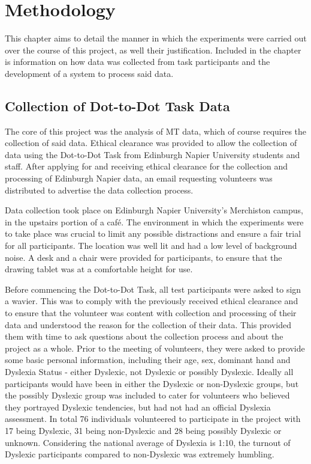 \section{Methodology}
	This chapter aims to detail the manner in which the experiments were carried out over the course of this project, as well their justification. Included in the chapter is information on how data was collected from task participants and the development of a system to process said data.

	\subsection{Collection of Dot-to-Dot Task Data}
		The core of this project was the analysis of MT data, which of course requires  the collection of said data. Ethical clearance was provided to allow the collection of data using the Dot-to-Dot Task from Edinburgh Napier University students and staff. After applying for and receiving ethical clearance for the collection and processing of Edinburgh Napier data, an email requesting volunteers was distributed to advertise the data collection process.
	
		Data collection took place on Edinburgh Napier University’s Merchiston campus, in the upstairs portion of a café. The environment in which the experiments were to take place was crucial to limit any possible distractions and ensure a fair trial for all participants. The location was well lit and had a low level of background noise. A desk and a chair were provided for participants, to ensure that the drawing tablet was at a comfortable height for use. 
	
		Before commencing the Dot-to-Dot Task, all test participants were asked to sign a wavier. This was to comply with the previously received ethical clearance and to ensure that the volunteer was content with collection and processing of their data and understood the reason for the collection of their data. This provided them with time to ask questions about the collection process and about the project as a whole. Prior to the meeting of volunteers, they were asked to provide some basic personal information, including their age, sex, dominant hand and Dyslexia Status - either Dyslexic, not Dyslexic or possibly Dyslexic. Ideally all participants would have been in either the Dyslexic or non-Dyslexic groups, but the possibly Dyslexic group was included to cater for volunteers who believed they portrayed Dyslexic tendencies, but had not had an official Dyslexia assessment. In total 76 individuals volunteered to participate in the project with 17 being Dyslexic, 31 being non-Dyslexic and 28 being possibly Dyslexic or unknown. Considering the national average of Dyslexia is 1:10, the turnout of Dyslexic participants compared to non-Dyslexic was extremely humbling.
	
